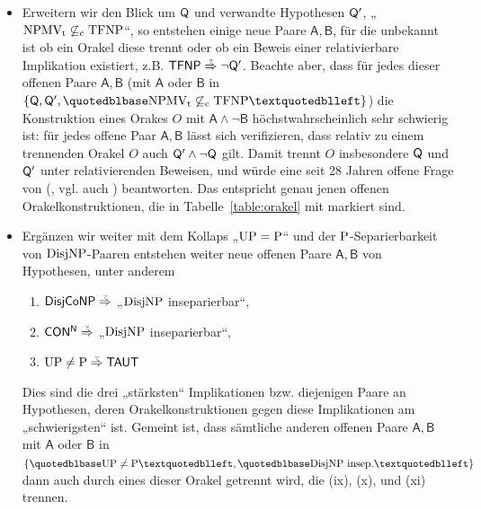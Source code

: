 \begin{itemize}[parsep=0pt,listparindent=\parindent,itemsep=5pt plus 1pt minus 1pt,midpenalty=0]
    \item Erweitern wir den Blick um $\hQ$ und verwandte Hypothesen $\hQ'$, „$\NPMVt\not\subseteqc \TFNP$“, so entstehen einige neue Paare $\mathsf{A,B}$, für die unbekannt ist ob ein Orakel diese trennt oder ob ein Beweis einer relativierbare Implikation existiert, z.B. $\hTFNP\stackrel{\smash{\text{\raisebox{-1pt}{\tiny ?}}}}{\Rightarrow}\neg\hQ'$. Beachte aber, dass für jedes dieser offenen Paare $\mathsf{A,B}$ (mit $\mathsf A$ oder $\mathsf B$ in $\{\hQ, \hQ', „\NPMVt\not\subseteqc \TFNP“\}$) die Konstruktion eines Orakes $O$ mit $\mathsf{A\land \neg B}$ höchstwahrscheinlich sehr schwierig ist: für jedes offene Paar $\mathsf{A,B}$ lässt sich verifizieren, dass relativ zu einem trennenden Orakel $O$ auch $\hQ'\land \neg \hQ$ gilt. Damit trennt $O$ insbesondere $\hQ$ und $\hQ'$ unter relativierenden Beweisen, und würde eine seit 28 Jahren offene Frage von \citeauthor{fenner_inverting_2003} (\citeyear{fenner_inverting_2003}, vgl. auch \citeyear{fenner_inverting_1996}) beantworten. Das entspricht genau jenen offenen Orakelkonstruktionen, die in Tabelle~\ref{table:orakel} mit \dag{} markiert sind.

    \item Ergänzen wir weiter mit dem Kollaps „$\UP=\P$“ und der $\P$-Separierbarkeit von $\DisjNP$-Paaren entstehen weiter neue offenen Paare $\mathsf{A,B}$ von Hypothesen, unter anderem
        \begin{enumerate}[noitemsep,resume,label=(\roman*)]
            \item $\hDisjCoNP\stackrel{\smash{\text{\raisebox{-1pt}{\tiny ?}}}}{\Rightarrow}$ „$\DisjNP$ inseparierbar“,
            \item $\mathsf{CON^N}\stackrel{\smash{\text{\raisebox{-1pt}{\tiny ?}}}}{\Rightarrow}$ „$\DisjNP$ inseparierbar“,
            \item $\UP\neq\P\stackrel{\smash{\text{\raisebox{-1pt}{\tiny ?}}}}{\Rightarrow} \hTAUT$
        \end{enumerate}
        Dies sind die drei „stärksten“ Implikationen bzw. diejenigen Paare an Hypothesen, deren Orakelkonstruktionen gegen diese Implikationen am „schwierigsten“ ist. Gemeint ist, dass sämtliche anderen offenen Paare $\mathsf{A,B}$ mit $\mathsf{A}$ oder $\mathsf{B}$ in $\{„\UP\neq\P“, „\DisjNP\text{ insep.}“\}$ dann auch durch eines dieser Orakel getrennt wird, die (ix), (x), und (xi) trennen.


\end{itemize}
